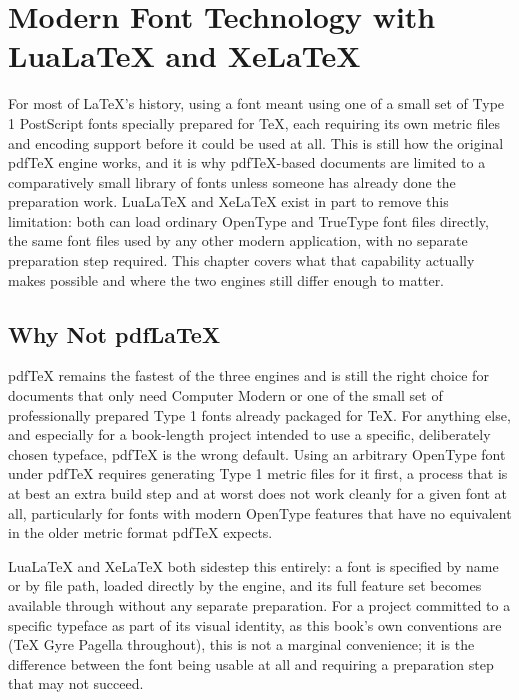 \hypertarget{chapter-9-modern-font-technology-with-lualatex-and-xelatex}{%
\chapter{Modern Font Technology with LuaLaTeX and XeLaTeX}\label{chapter-9-modern-font-technology-with-lualatex-and-xelatex}}

For most of LaTeX's history, using a font meant using one of a small set of Type 1 PostScript fonts specially prepared for TeX, each requiring its own metric files and encoding support before it could be used at all. This is still how the original pdfTeX engine works, and it is why pdfTeX-based documents are limited to a comparatively small library of fonts unless someone has already done the preparation work. LuaLaTeX and XeLaTeX exist in part to remove this limitation: both can load ordinary OpenType and TrueType font files directly, the same font files used by any other modern application, with no separate preparation step required. This chapter covers what that capability actually makes possible and where the two engines still differ enough to matter.

\hypertarget{why-not-pdflatex}{%
\section{Why Not pdfLaTeX}\label{why-not-pdflatex}}

pdfTeX remains the fastest of the three engines and is still the right choice for documents that only need Computer Modern or one of the small set of professionally prepared Type 1 fonts already packaged for TeX. For anything else, and especially for a book-length project intended to use a specific, deliberately chosen typeface, pdfTeX is the wrong default. Using an arbitrary OpenType font under pdfTeX requires generating Type 1 metric files for it first, a process that is at best an extra build step and at worst does not work cleanly for a given font at all, particularly for fonts with modern OpenType features that have no equivalent in the older metric format pdfTeX expects.

LuaLaTeX and XeLaTeX both sidestep this entirely: a font is specified by name or by file path, loaded directly by the engine, and its full feature set becomes available through  without any separate preparation. For a project committed to a specific typeface as part of its visual identity, as this book's own conventions are (TeX Gyre Pagella throughout), this is not a marginal convenience; it is the difference between the font being usable at all and requiring a preparation step that may not succeed.

